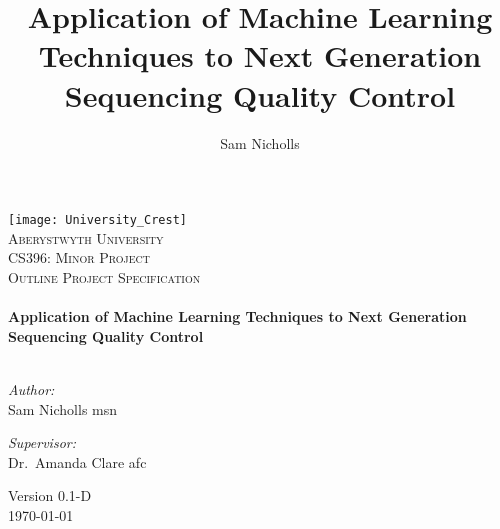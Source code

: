 \documentclass[a4paper,times,numbered,print,index,oneside,PageStyleII]{Classes/PhDThesisPSnPDF}
\title{Application of Machine Learning Techniques to Next Generation Sequencing Quality Control}
\author{Sam Nicholls}
\begin{document}
\frontmatter

\begin{titlepage}
\begin{center}

\texttt{[image: University\_Crest]}~\\[1cm]

\textsc{\LARGE Aberystwyth University}\\
\textsc{\Large CS396: Minor Project}\\[1.5cm]

\textsc{\Large Outline Project Specification}\\[0.5cm]

\HRule \\[0.4cm]
{ \huge \bfseries Application of Machine Learning Techniques to Next Generation Sequencing Quality Control \\[0.5cm] }
\HRule \\[1.5cm]

\begin{minipage}{0.4\textwidth}
    \begin{flushleft} \large
        \emph{Author:}\\
        Sam Nicholls \small{msn}
    \end{flushleft}
\end{minipage}
\begin{minipage}{0.4\textwidth}
    \begin{flushright} \large
        \emph{Supervisor:} \\
        Dr.~Amanda Clare \small{afc}
    \end{flushright}
\end{minipage}

\vfill

Version 0.1-D\\
{\large \today}

\end{center}
\end{titlepage}

%
%
%
%


\end{document}
